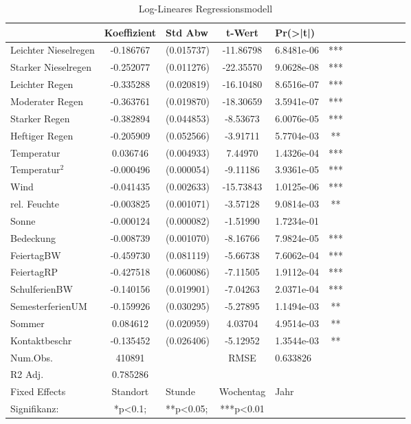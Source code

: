 \documentclass[a4paper,12pt]{thesis}
\begin{document}
\begin{table}[!ht]
	\centering
	\caption{Log-Lineares Regressionsmodell}
	\begin{tabular}[t]{lc lc lc lc lc lc}
		\toprule
		& Koeffizient & Std Abw & t-Wert & Pr(>|t|) & \\
		\midrule
		Leichter Nieselregen & -0.186767 & (0.015737) & -11.86798 & 6.8481e-06 & ***\\
		Starker Nieselregen & -0.252077 & (0.011276) & -22.35570 & 9.0628e-08 & ***\\
		Leichter Regen & -0.335288 & (0.020819) & -16.10480 & 8.6516e-07 & ***\\
		Moderater Regen & -0.363761 & (0.019870) & -18.30659 & 3.5941e-07 & ***\\
		Starker Regen & -0.382894 & (0.044853) & -8.53673 & 6.0076e-05 & ***\\
		Heftiger Regen & -0.205909 & (0.052566) & -3.91711 & 5.7704e-03 & **\\
		Temperatur & 0.036746 & (0.004933) & 7.44970 & 1.4326e-04 & ***\\
		Temperatur$^2$ & -0.000496 & (0.000054) & -9.11186 & 3.9361e-05 & ***\\
		Wind & -0.041435 & (0.002633) & -15.73843 & 1.0125e-06 & ***\\
		rel. Feuchte & -0.003825 & (0.001071) & -3.57128 & 9.0814e-03 & **\\
		Sonne & -0.000124 & (0.000082) & -1.51990 & 1.7234e-01 & \\
		Bedeckung & -0.008739 & (0.001070) & -8.16766 & 7.9824e-05 & ***\\
		FeiertagBW & -0.459730 & (0.081119) & -5.66738 & 7.6062e-04 & ***\\
		FeiertagRP & -0.427518 & (0.060086) & -7.11505 & 1.9112e-04 & ***\\
		SchulferienBW & -0.140156 & (0.019901) & -7.04263 & 2.0371e-04 & ***\\
		SemesterferienUM & -0.159926 & (0.030295) & -5.27895 & 1.1494e-03 & **\\
		Sommer & 0.084612 & (0.020959) & 4.03704 & 4.9514e-03 & **\\
		Kontaktbeschr & -0.135452 & (0.026406) & -5.12952 & 1.3544e-03 & **\\
		\midrule
		Num.Obs. & 410891& & RMSE & 0.633826 & \\
		R2 Adj. & 0.785286 &  &  &  & \\
		\bottomrule
		Fixed Effects & Standort & Stunde & Wochentag & Jahr & \\
		Signifikanz: & *p<0.1; & **p<0.05; &***p<0.01 & &\\
	\end{tabular}
\label{reg1}
\end{table}
\end{document}
